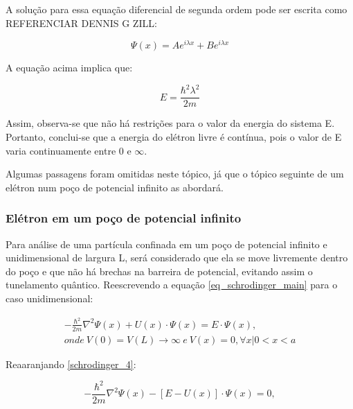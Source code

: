   \par A solução para essa equação diferencial de segunda ordem pode ser escrita como REFERENCIAR DENNIS G ZILL:

  \begin{equation}
    \label{schrodinger_2}
    \Psi(x) = Ae^{i\lambda x} + Be^{i\lambda x}  
  \end{equation}

  \par A equação acima implica que:

  \begin{equation}
    \label{schrodinger_3}
    E = \frac{\hbar^2 \lambda^2}{2m}
  \end{equation}

  \par Assim, observa-se que não há restrições para o valor da energia do sistema E. Portanto, conclui-se que a energia do elétron livre é contínua, pois o valor de E varia continuamente entre $0$ e $\infty$.

  \par Algumas passagens foram omitidas neste tópico, já que o tópico seguinte de um elétron num poço de potencial infinito as abordará. 

\subsubsection{Elétron em um poço de potencial infinito}

  \par Para análise de uma partícula confinada em um poço de potencial infinito e unidimensional de largura L, será considerado que ela se move livremente dentro do poço e que não há brechas na barreira de potencial, evitando assim o tunelamento quântico. Reescrevendo a equação \eqref{eq_schrodinger_main} para o caso unidimensional: 

  \begin{align}\label{schrodinger_4}
      -\frac{\hbar^2}{2m} \nabla^2 \Psi(x) + U(x) \cdot \Psi(x) = E \cdot \Psi(x),\\
      onde\ V(0)=V(L)\rightarrow \infty\ e\ V(x)=0,\forall x | 0<x<a
  \end{align}

  \par Reaaranjando \eqref{schrodinger_4}:

  \begin{equation}\label{schrodinger_5}
    -\frac{\hbar^2}{2m} \nabla^2 \Psi(x) - [E - U(x)] \cdot \Psi(x) = 0,
  \end{equation}

